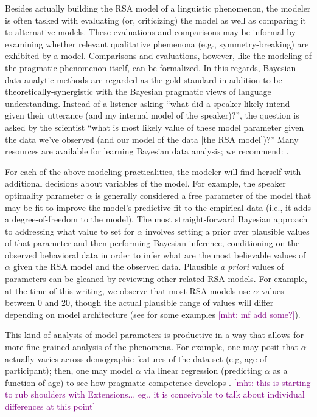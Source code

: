 \documentclass{sp}
\newcommand{\mht}[1]{\textcolor{purple}{[mht: #1]}}
\begin{document}
Besides actually building the RSA model of a linguistic phenomenon, the modeler is often tasked with evaluating (or, criticizing) the model as well as comparing it to alternative models.
These evaluations and comparisons may be informal by examining whether relevant qualitative phemenona (e.g., symmetry-breaking) are exhibited by a model.
Comparisons and evaluations, however, like the modeling of the pragmatic phenomenon itself, can be formalized. 
In this regards, Bayesian data analytic methods are regarded as the gold-standard in addition to be theoretically-synergistic with the Bayesian pragmatic views of language understanding.
Instead of a listener asking ``what did a speaker likely intend given their utterance (and my internal model of the speaker)?'', the question is asked by the scientist ``what is most likely value of these model parameter given the data we've observed (and our model of the data [the RSA model])?''
Many resources are available for learning Bayesian data analysis; we recommend: \cite{gelman2013bayesian, kruschke2014doing, lee2014bayesian}.

For each of the above modeling practicalities, the modeler will find herself with additional decisions about variables of the model. For example, the speaker optimality parameter $\alpha$ is generally considered a free parameter of the model that may be fit to improve the model's predictive fit to the empirical data (i.e., it adds a degree-of-freedom to the model). The most straight-forward Bayesian approach to addressing what value to set for $\alpha$ involves setting a prior over plausible values of that parameter and then performing Bayesian inference, conditioning on the observed behavioral data in order to infer what are the most believable values of $\alpha$ given the RSA model and the observed data. 
Plausible \emph{a priori} values of parameters can be gleaned by reviewing other related RSA models. For example, at the time of this writing, we observe that most RSA models use $\alpha$ values between 0 and 20, though the actual plausible range of values will differ depending on model architecture (see \citealp{tesslergoodman2019, yoonetal2020} for some examples \mht{mf add some?}). 



This kind of analysis of model parameters is productive in a way that allows for more fine-grained analysis of the phenomena. For example, one may posit that $\alpha$ actually varies across demographic features of the data set (e.g, age of participant); then, one may model $\alpha$ via linear regression (predicting $\alpha$ as a function of age) to see how pragmatic competence develops \citep{bohn2019predicting}.
\mht{this is starting to rub shoulders with Extensions... eg., it is conceivable to talk about individual differences at this point}
\end{document}
